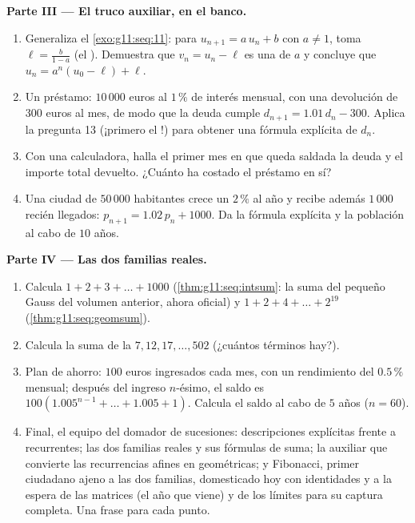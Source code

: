 \begin{problem}
\medskip
\noindent\textbf{Parte III --- El truco auxiliar, en el banco.}
\begin{enumerate}[resume]
  \item Generaliza el \cref{exo:g11:seq:11}: para $u_{n+1} = a\,u_n + b$
        con $a \neq 1$, toma $\ell = \frac{b}{1 - a}$ (el ).
        Demuestra que $v_n = u_n - \ell$ es una  de
         $a$ y concluye que $u_n = a^n (u_0 - \ell) + \ell$.
  \item Un préstamo: $10\,000$ euros al $1\,\%$ de interés mensual, con
        una devolución de $300$ euros al mes, de modo que la deuda cumple
        $d_{n+1} = 1.01\,d_n - 300$. Aplica la pregunta 13 (¡primero el
        !) para obtener una fórmula explícita de $d_n$.
  \item Con una calculadora, halla el primer mes en que queda saldada la
        deuda y el importe total devuelto. ¿Cuánto ha costado el préstamo
        en sí?
  \item Una ciudad de $50\,000$ habitantes crece un $2\,\%$ al año y
        recibe además $1\,000$ recién llegados:
        $p_{n+1} = 1.02\,p_n + 1000$. Da la fórmula explícita y la
        población al cabo de $10$ años.
\end{enumerate}

\medskip
\noindent\textbf{Parte IV --- Las dos familias reales.}
\begin{enumerate}[resume]
  \item Calcula $1 + 2 + 3 + \dots + 1000$ (\cref{thm:g11:seq:intsum}: la
        suma del pequeño Gauss del volumen anterior, ahora oficial) y
        $1 + 2 + 4 + \dots + 2^{19}$ (\cref{thm:g11:seq:geomsum}).
  \item Calcula la suma de la 
        $7, 12, 17, \dots, 502$ (¿cuántos términos hay?).
  \item Plan de ahorro: $100$ euros ingresados cada mes, con un
        rendimiento del $0.5\,\%$ mensual; después del ingreso $n$-ésimo,
        el saldo es $100\left(1.005^{n-1} + \dots + 1.005 + 1\right)$.
        Calcula el saldo al cabo de $5$ años ($n = 60$).
  \item Final, el equipo del domador de sucesiones: descripciones
        explícitas frente a recurrentes; las dos familias reales y sus
        fórmulas de suma; la  auxiliar que convierte las
        recurrencias afines en geométricas; y Fibonacci, primer ciudadano
        ajeno a las dos familias, domesticado hoy con identidades y a la
        espera de las matrices (el año que viene) y de los límites para su
        captura completa. Una frase para cada punto.
\end{enumerate}
\end{problem}
